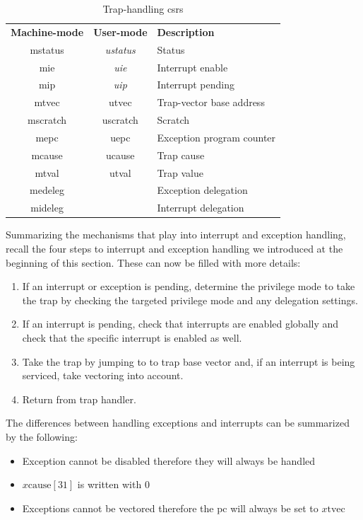 \begin{table}
    \centering
    \begin{tabular}{| c c || l |}
        \hline
        \textbf{Machine-mode} & \textbf{User-mode} & \textbf{Description} \\
        \acrshort{mstatus} & \textit{\acrshort{ustatus}} & Status \\
        \acrshort{mie} & \textit{\acrshort{uie}} & Interrupt enable \\
        \acrshort{mip} & \textit{\acrshort{uip}} & Interrupt pending \\
        \acrshort{mtvec} & \acrshort{utvec} & Trap-vector base address \\
        \acrshort{mscratch} & \acrshort{uscratch} & Scratch \\
        \acrshort{mepc} & \acrshort{uepc} & Exception program counter \\
        \acrshort{mcause} & \acrshort{ucause} & Trap cause \\
        \acrshort{mtval} & \acrshort{utval} & Trap value \\
        \acrshort{medeleg} & & Exception delegation \\
        \acrshort{mideleg} & & Interrupt delegation \\
        \hline
    \end{tabular}
    \caption{Trap-handling \glspl{csr}}
    \label{tbl:trap-csrs}
\end{table}

Summarizing the mechanisms that play into interrupt and exception handling, recall the four steps to interrupt and exception handling we introduced at the beginning of this section.
These can now be filled with more details:
\begin{enumerate}
    \item If an interrupt or exception is pending, determine the privilege mode to take the trap by checking the targeted privilege mode and any delegation settings.
    \item If an interrupt is pending, check that interrupts are enabled globally and check that the specific interrupt is enabled as well.
    \item Take the trap by jumping to to trap base vector and, if an interrupt is being serviced, take vectoring into account.
    \item Return from trap handler.
\end{enumerate}

The differences between handling exceptions and interrupts can be summarized by the following:
\begin{itemize}
    \item Exception cannot be disabled therefore they will always be handled
    \item $ x\text{cause}[31] $ is written with $ 0 $
    \item Exceptions cannot be vectored therefore the \gls{pc} will always be set to $ x\text{tvec} $
\end{itemize}

